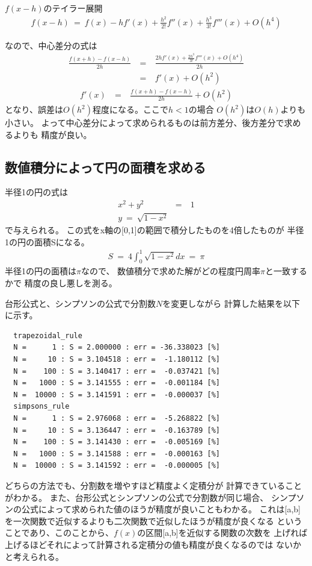 \documentclass[dvipdfmx]{jsarticle}
\begin{document}
$f(x-h)のテイラー展開$
\begin{eqnarray}
  f(x-h) ~=~ f(x)-hf'(x)+\frac{h^2}{2!}f''(x)+\frac{h^3}{3!}f'''(x)+O(h^4) \nonumber
\end{eqnarray}

なので、中心差分の式は
\begin{eqnarray}
  \frac{f(x+h)-f(x-h)}{2h} ~&=&~ \frac{2hf'(x)+\frac{2h^3}{3!}f'''(x)+O(h^4)}{2h}\nonumber\\
  &=&~ f'(x)+O(h^2)\nonumber
\end{eqnarray}
\begin{eqnarray}
  f'(x) ~&=&~ \frac{f(x+h)-f(x-h)}{2h}+O(h^2)
\end{eqnarray}
となり、誤差は$O(h^2)$程度になる。ここで$h<1$の場合
$O(h^2)$は$O(h)$よりも小さい。
よって中心差分によって求められるものは前方差分、後方差分で求めるよりも
精度が良い。


\subsection{数値積分によって円の面積を求める}

半径1の円の式は
\begin{eqnarray}
  x^2+y^2 ~&=&~ 1 \nonumber\\
  y ~=~ \sqrt{1-x^2}
\end{eqnarray}
で与えられる。
この式をx軸の[0,1]の範囲で積分したものを4倍したものが
半径1の円の面積Sになる。
\begin{eqnarray}
  S ~=~ 4\int_0^1 \sqrt{1-x^2}dx ~=~ \pi
  \label{fomula:pi}
\end{eqnarray}
半径1の円の面積は$\pi$なので、
数値積分で求めた解がどの程度円周率$\pi$と一致するかで
精度の良し悪しを測る。

台形公式と、シンプソンの公式で分割数$N$を変更しながら
計算した結果を以下に示す。
\begin{verbatim}
  trapezoidal_rule
  N =      1 : S = 2.000000 : err = -36.338023 [%]
  N =     10 : S = 3.104518 : err =  -1.180112 [%]
  N =    100 : S = 3.140417 : err =  -0.037421 [%]
  N =   1000 : S = 3.141555 : err =  -0.001184 [%]
  N =  10000 : S = 3.141591 : err =  -0.000037 [%]
  simpsons_rule
  N =      1 : S = 2.976068 : err =  -5.268822 [%]
  N =     10 : S = 3.136447 : err =  -0.163789 [%]
  N =    100 : S = 3.141430 : err =  -0.005169 [%]
  N =   1000 : S = 3.141588 : err =  -0.000163 [%]
  N =  10000 : S = 3.141592 : err =  -0.000005 [%]
\end{verbatim}

どちらの方法でも、分割数を増やすほど精度よく定積分が
計算できていることがわかる。
また、台形公式とシンプソンの公式で分割数が同じ場合、
シンプソンの公式によって求められた値のほうが精度が良いこともわかる。
これは[a,b]を一次関数で近似するよりも二次関数で近似したほうが精度が良くなる
ということであり、このことから、$f(x)$の区間[a,b]を近似する関数の次数を
上げれば上げるほどそれによって計算される定積分の値も精度が良くなるのでは
ないかと考えられる。
\end{document}
